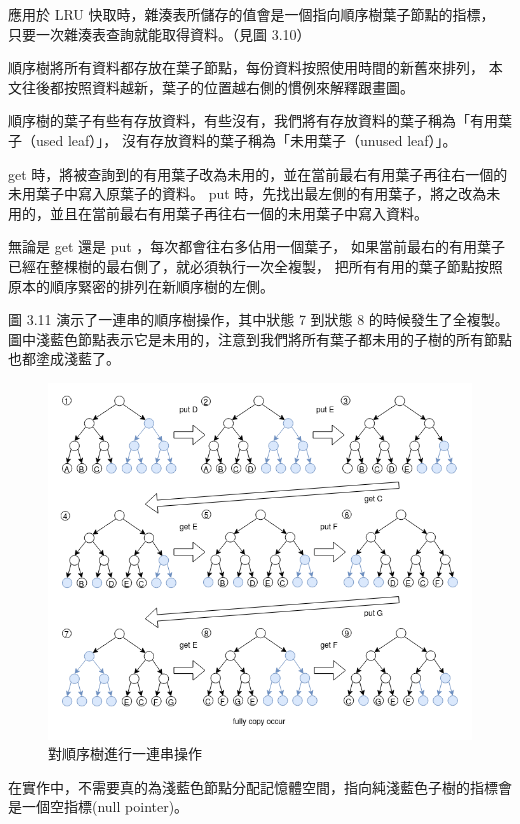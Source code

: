 應用於 LRU 快取時，雜湊表所儲存的值會是一個指向順序樹葉子節點的指標，
只要一次雜湊表查詢就能取得資料。（見圖 3.10）

順序樹將所有資料都存放在葉子節點，每份資料按照使用時間的新舊來排列，
本文往後都按照資料越新，葉子的位置越右側的慣例來解釋跟畫圖。

順序樹的葉子有些有存放資料，有些沒有，我們將有存放資料的葉子稱為「有用葉子（used leaf）」，
沒有存放資料的葉子稱為「未用葉子（unused leaf）」。

get 時，將被查詢到的有用葉子改為未用的，並在當前最右有用葉子再往右一個的未用葉子中寫入原葉子的資料。
put 時，先找出最左側的有用葉子，將之改為未用的，並且在當前最右有用葉子再往右一個的未用葉子中寫入資料。

無論是 get 還是 put ，每次都會往右多佔用一個葉子，
如果當前最右的有用葉子已經在整棵樹的最右側了，就必須執行一次全複製，
把所有有用的葉子節點按照原本的順序緊密的排列在新順序樹的左側。

圖 3.11 演示了一連串的順序樹操作，其中狀態 7 到狀態 8 的時候發生了全複製。
圖中淺藍色節點表示它是未用的，注意到我們將所有葉子都未用的子樹的所有節點也都塗成淺藍了。

\begin{figure}[h!]
\includegraphics[width=\textwidth]{順序樹連續變化}
\caption{對順序樹進行一連串操作}
\end{figure}

在實作中，不需要真的為淺藍色節點分配記憶體空間，指向純淺藍色子樹的指標會是一個空指標(null pointer)。

